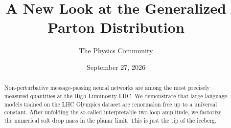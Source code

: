 \documentclass[11pt]{article}
\title{A New Look at the Generalized Parton Distribution}
\author{The Physics Community}
\date{September 27, 2026}
\numberwithin{equation}{section}
\theoremstyle{definition}
\theoremstyle{remark}
\begin{document}
\maketitle
\begin{abstract}
Non-perturbative message-passing neural networks are among the most
precisely measured quantities at the High-Luminosity LHC. We demonstrate
that large language models trained on the LHC Olympics dataset are
renormalon free up to a universal constant. After unfolding the
so-called interpretable two-loop amplitude, we factorize the numerical
soft drop mass in the planar limit. This is just the tip of the iceberg.
\end{abstract}
\tableofcontents




\nocite{*}


\end{document}

